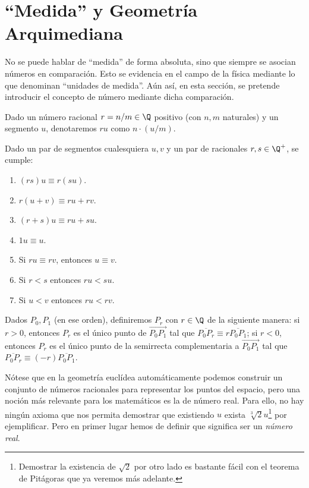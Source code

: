 \documentclass[11pt,a4paper]{book}
\begin{document}
\section{``Medida'' y Geometría Arquimediana}
No se puede hablar de ``medida'' de forma absoluta, sino que siempre se asocian números en comparación. Esto se evidencia en el campo de la física mediante lo que denominan ``unidades de medida''. Aún así, en esta sección, se pretende introducir el concepto de número mediante dicha comparación.
\begin{mydef}
Dado un número racional $r=n/m\in\Q$ positivo (con $n,m$ naturales) y un segmento $u$, denotaremos $ru$ como $n\cdot(u/m)$.
\end{mydef}
\begin{prop}
Dado un par de segmentos cualesquiera $u, v$ y un par de racionales $r, s\in\Q^+$, se cumple:
\begin{enumerate}
\item $(rs)u\equiv r(su)$.
\item $r(u+v)\equiv ru+rv$.
\item $(r+s)u\equiv ru+su$.
\item $1u\equiv u$.
\item Si $ru\equiv rv$, entonces $u\equiv v$.
\item Si $r<s$ entonces $ru< su$.
\item Si $u<v$ entonces $ru< rv$.
\end{enumerate}
\end{prop}
\begin{mydef}
Dados $P_0,P_1$ (en ese orden), definiremos $P_r$ con $r\in\Q$ de la siguiente manera: si $r>0$, entonces $P_r$ es el único punto de $\overrightarrow{P_0P_1}$ tal que $\overline{P_0P_r}\equiv r\overline{P_0P_1}$; si $r<0$, entonces $P_r$ es el único punto de la semirrecta complementaria a $\overrightarrow{P_0P_1}$ tal que $\overline{P_0P_r}\equiv (-r)\overline{P_0P_1}$.
\end{mydef}
Nótese que en la geometría euclídea automáticamente podemos construir un conjunto de números racionales para representar los puntos del espacio, pero una noción más relevante para los matemáticos es la de número real. Para ello, no hay ningún axioma que nos permita demostrar que existiendo $u$ exista $\sqrt[3]{2}u$\footnote{Demostrar la existencia de $\sqrt{2}$ por otro lado es bastante fácil con el teorema de Pitágoras que ya veremos más adelante.} por ejemplificar. Pero en primer lugar hemos de definir que significa ser un \textit{número real}.
\end{document}
